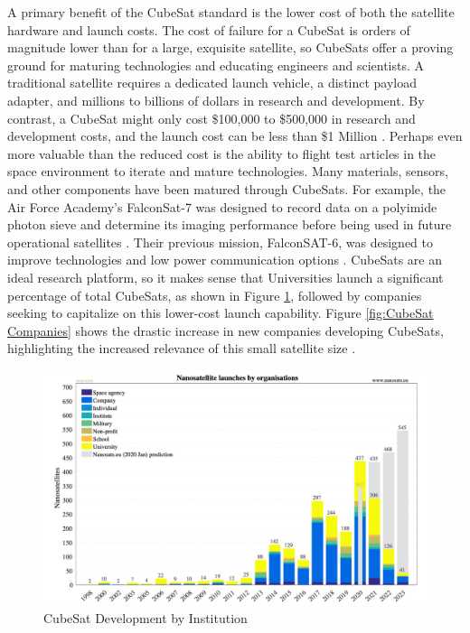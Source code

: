 A primary benefit of the CubeSat standard is the lower cost of both the satellite hardware and launch costs. The cost of failure for a CubeSat is orders of magnitude lower than for a large, exquisite satellite, so CubeSats offer a proving ground for maturing technologies and educating engineers and scientists. A traditional satellite requires a dedicated launch vehicle, a distinct payload adapter, and millions to billions of dollars in research and development. By contrast, a CubeSat might only cost \$100,000 to \$500,000 in research and development costs, and the launch cost can be less than \$1 Million \citep{Wertz2011SpaceSMAD}. Perhaps even more valuable than the reduced cost is the ability to flight test articles in the space environment to iterate and mature technologies. Many materials, sensors, and other components have been matured through CubeSats. For example, the Air Force Academy's FalconSat-7 was designed to record data on a polyimide photon sieve and determine its imaging performance before being used in future operational satellites \citep{FalconSat7}. Their previous mission, FalconSAT-6, was designed to improve  technologies and low power communication options \citep{FalconSat6}. CubeSats are an ideal research platform, so it makes sense that Universities launch a significant percentage of total CubeSats, as shown in Figure \ref{fig:CubeSat Development by Institution}, followed by companies seeking to capitalize on this lower-cost launch capability. Figure \ref{fig:CubeSat Companies} shows the drastic increase in new companies developing CubeSats, highlighting the increased relevance of this small satellite size \citep{NanosatsEU}.

\begin{figure}[H]
    \centering
    \includegraphics[width=\textwidth]{Thesis/Literature_Review/Lit Review Figures/launch institutions.png}
    \caption{CubeSat Development by Institution}
    \label{fig:CubeSat Development by Institution}
\end{figure}

